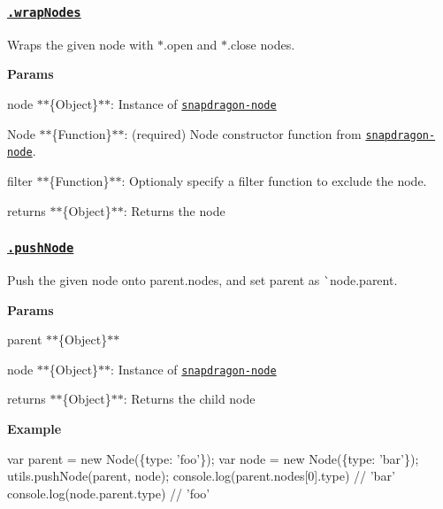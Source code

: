 \subsubsection*{\href{index.js#L274}{\tt .wrap\+Nodes}}

Wraps the given {\ttfamily node} with {\ttfamily $\ast$.open} and {\ttfamily $\ast$.close} nodes.

{\bfseries Params}


\begin{DoxyItemize}
\item {\ttfamily node} $\ast$$\ast$\{Object\}$\ast$$\ast$\+: Instance of \href{https://github.com/jonschlinkert/snapdragon-node}{\tt snapdragon-\/node}
\item {\ttfamily Node} $\ast$$\ast$\{Function\}$\ast$$\ast$\+: (required) Node constructor function from \href{https://github.com/jonschlinkert/snapdragon-node}{\tt snapdragon-\/node}.
\item {\ttfamily filter} $\ast$$\ast$\{Function\}$\ast$$\ast$\+: Optionaly specify a filter function to exclude the node.
\item {\ttfamily returns} $\ast$$\ast$\{Object\}$\ast$$\ast$\+: Returns the node
\end{DoxyItemize}

\subsubsection*{\href{index.js#L299}{\tt .push\+Node}}

Push the given {\ttfamily node} onto {\ttfamily parent.\+nodes}, and set {\ttfamily parent} as \`{}node.parent.

{\bfseries Params}


\begin{DoxyItemize}
\item {\ttfamily parent} $\ast$$\ast$\{Object\}$\ast$$\ast$
\item {\ttfamily node} $\ast$$\ast$\{Object\}$\ast$$\ast$\+: Instance of \href{https://github.com/jonschlinkert/snapdragon-node}{\tt snapdragon-\/node}
\item {\ttfamily returns} $\ast$$\ast$\{Object\}$\ast$$\ast$\+: Returns the child node
\end{DoxyItemize}

{\bfseries Example}


\begin{DoxyCode}
var parent = new Node(\{type: 'foo'\});
var node = new Node(\{type: 'bar'\});
utils.pushNode(parent, node);
console.log(parent.nodes[0].type) // 'bar'
console.log(node.parent.type) // 'foo'
\end{DoxyCode}


